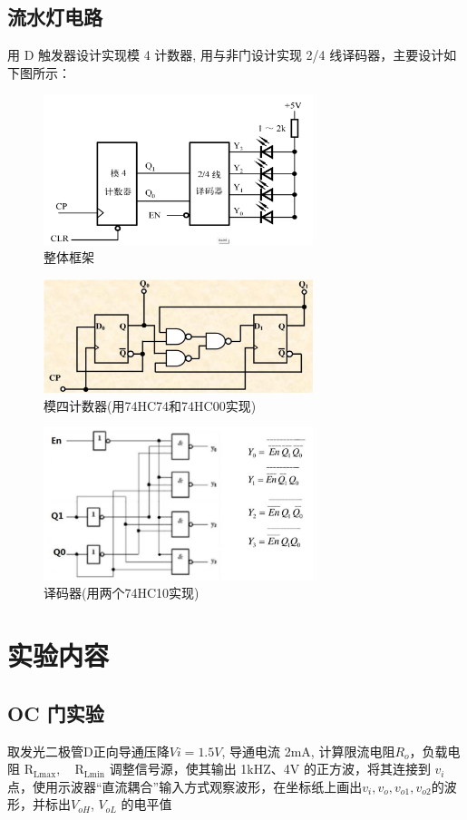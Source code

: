 \documentclass[a4paper,11pt,UTF8]{article}
\begin{document}
\subsection{流水灯电路}
用 D 触发器设计实现模 4 计数器, 用与非门设计实现 2/4 线译码器，主要设计如下图所示：
\begin{figure}[!ht]
	\centering
	\includegraphics[width=0.7\textwidth]{frame}
	\caption{整体框架}
\end{figure}
\begin{figure}[!ht]
	\centering
	\includegraphics[width=0.7\textwidth]{Cal}
	\caption{模四计数器(用74HC74和74HC00实现)}
\end{figure}
\begin{figure}[!ht]
	\centering
	\includegraphics[width=0.7\textwidth]{yimaqi}
	\caption{译码器(用两个74HC10实现)}
\end{figure}
\section{实验内容}
\subsection{OC 门实验}
取发光二极管D正向导通压降$ Vi=1.5V$, 导通电流 2mA, 计算限流电阻$R_o$，负载电阻 $\mathrm{R}_{\mathrm{Lmax}},\quad\mathrm{R}_{\mathrm{Lmin}}$
调整信号源，使其输出 1kHZ、4V 的正方波，将其连接到 $v_i$点，使用示波器“直流耦合”输入方式观察波形，在坐标纸上画出$v_i, v_o, v_{o1}, v_{o2}$的波形，并标出$V_{oH}$,
$V_{oL}$ 的电平值
\end{document}
